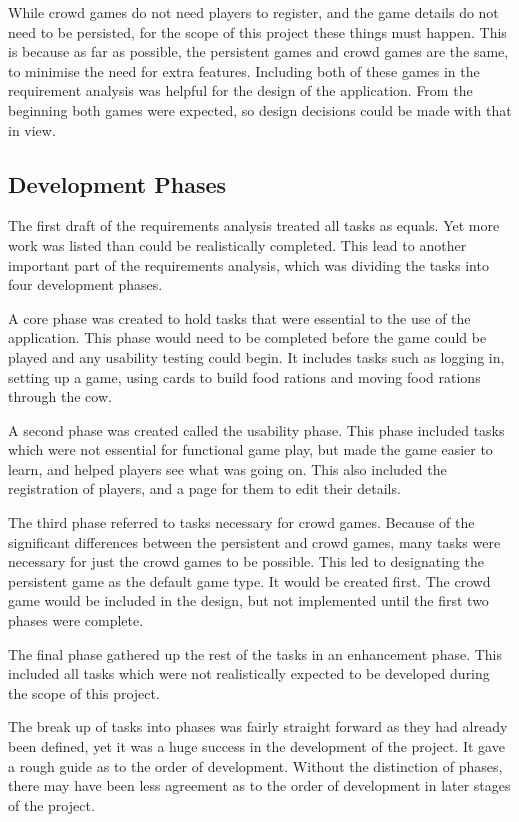 While crowd games do not need players to register, and the game details do not need to be persisted, for the scope of this project these things must happen. This is because as far as possible, the persistent games and crowd games are the same, to minimise the need for extra features. Including both of these games in the requirement analysis was helpful for the design of the application. From the beginning both games were expected, so design decisions could be made with that in view.

\subsection{Development Phases}
The first draft of the requirements analysis treated all tasks as equals. Yet more work was listed than could be realistically completed. This lead to another important part of the requirements analysis, which was dividing the tasks into four development phases. 
	
A core phase was created to hold tasks that were essential to the use of the application. This phase would need to be completed before the game could be played and any usability testing could begin. It includes tasks such as logging in, setting up a game, using cards to build food rations and moving food rations through the cow.
	
A second phase was created called the usability phase. This phase included tasks which were not essential for functional game play, but made the game easier to learn, and helped players see what was going on. This also included the registration of players, and a page for them to edit their details.
	
The third phase referred to tasks necessary for crowd games. Because of the significant differences between the persistent and crowd games, many tasks were necessary for just the crowd games to be possible. This led to designating the persistent game as the default game type. It would be created first. The crowd game would be included in the design, but not implemented until the first two phases were complete.
	
The final phase gathered up the rest of the tasks in an enhancement phase. This included all tasks which were not realistically expected to be developed during the scope of this project.
	
The break up of tasks into phases was fairly straight forward as they had already been defined, yet it was a huge success in the development of the project. It gave a rough guide as to the order of development. Without the distinction of phases, there may have been less agreement as to the order of development in later stages of the project.


